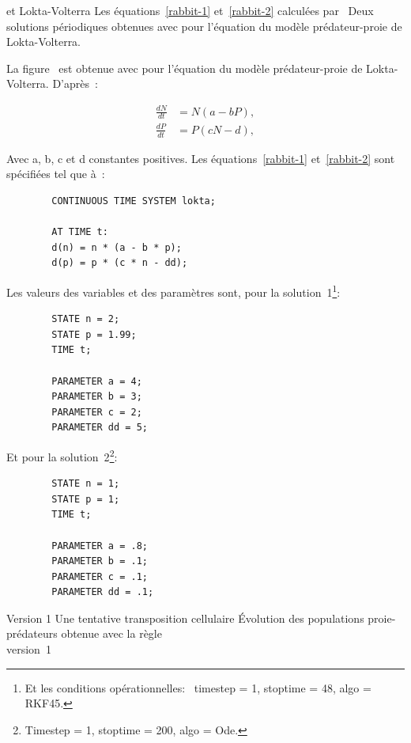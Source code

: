 %
{ et Lokta-Volterra}%
{Les équations~\ref{rabbit-1} et~\ref{rabbit-2} calculées par~}%
{Deux solutions périodiques obtenues avec \protect{} pour
  l'équation du modèle prédateur-proie de Lokta-Volterra.}

La figure~
est obtenue avec  pour l'équation
du modèle prédateur-proie de Lokta-Volterra. %
D'après~\cite{Murray90}:

\begin{eqnarray}
  \frac{dN}{dt} & = N(a-bP), \label{rabbit-1}\\
  \frac{dP}{dt} & = P(cN-d), \label{rabbit-2}
\end{eqnarray}

Avec a, b, c et d constantes positives. %
Les équations~\ref{rabbit-1} et~\ref{rabbit-2} sont spécifiées tel
que à~:

\footnotesize
\begin{verbatim}
        CONTINUOUS TIME SYSTEM lokta;
        
        AT TIME t:
        d(n) = n * (a - b * p);
        d(p) = p * (c * n - dd);
\end{verbatim}
\normalsize

Les valeurs des variables et des paramètres sont, pour la
solution~1\footnote{%
  Et les conditions opérationnelles:~%
  timestep = 1, %
  stoptime = 48, %
  algo = RKF45.}:

\begin{footnotesize}
\begin{verbatim}
        STATE n = 2;
        STATE p = 1.99;
        TIME t;
        
        PARAMETER a = 4;
        PARAMETER b = 3;
        PARAMETER c = 2;
        PARAMETER dd = 5;
\end{verbatim}
\end{footnotesize}

Et pour la solution~2\footnote{%
  Timestep = 1, stoptime = 200, algo = Ode.}:

\footnotesize
\begin{verbatim}
        STATE n = 1;
        STATE p = 1;
        TIME t;
        
        PARAMETER a = .8;
        PARAMETER b = .1;
        PARAMETER c = .1;
        PARAMETER dd = .1;
\end{verbatim}
\normalsize

%
{ Version 1}%
{Une tentative transposition cellulaire}%
{Évolution des populations proie-prédateurs obtenue avec la règle\\
   version~1}


